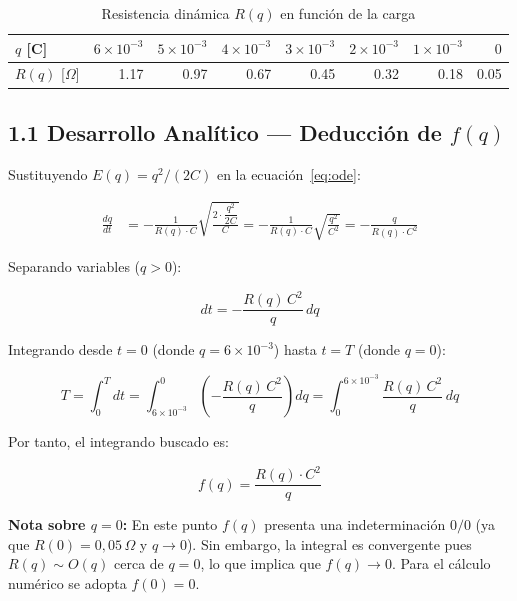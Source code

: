 \documentclass[12pt,a4paper]{article}
\begin{document}
\begin{table}[H]
    \centering
    \caption{Resistencia dinámica $R(q)$ en función de la carga}
    \label{tab:Rq}
    \begin{tabular}{lrrrrrrr}
        \toprule
        $q$ [C] & $6\!\times\!10^{-3}$ & $5\!\times\!10^{-3}$ & $4\!\times\!10^{-3}$ &
                  $3\!\times\!10^{-3}$ & $2\!\times\!10^{-3}$ & $1\!\times\!10^{-3}$ & $0$ \\
        \midrule
        $R(q)$ [$\Omega$] & 1.17 & 0.97 & 0.67 & 0.45 & 0.32 & 0.18 & 0.05 \\
        \bottomrule
    \end{tabular}
\end{table}

\subsection{1.1 Desarrollo Analítico --- Deducción de $f(q)$}

Sustituyendo $E(q) = q^2/(2C)$ en la ecuación~\eqref{eq:ode}:

\begin{align}
    \frac{dq}{dt}
    &= -\frac{1}{R(q)\cdot C}\sqrt{\frac{2\cdot\dfrac{q^2}{2C}}{C}}
     = -\frac{1}{R(q)\cdot C}\sqrt{\frac{q^2}{C^2}}
     = -\frac{q}{R(q)\cdot C^2}
    \label{eq:ode2}
\end{align}

Separando variables ($q > 0$):

\begin{equation}
    dt = -\frac{R(q)\,C^2}{q}\,dq
\end{equation}

Integrando desde $t=0$ (donde $q=6\times10^{-3}$) hasta $t=T$ (donde $q=0$):

\begin{equation}
    T = \int_0^T dt
      = \int_{6\times10^{-3}}^{0} \left(-\frac{R(q)\,C^2}{q}\right) dq
      = \int_0^{6\times10^{-3}} \frac{R(q)\,C^2}{q}\,dq
\end{equation}

Por tanto, el integrando buscado es:

\begin{equation}
    \boxed{f(q) = \frac{R(q)\cdot C^2}{q}}
    \label{eq:fq}
\end{equation}

\textbf{Nota sobre $q=0$:} En este punto $f(q)$ presenta una indeterminación
$0/0$ (ya que $R(0)=0{,}05\,\Omega$ y $q\to 0$). Sin embargo, la integral
es convergente pues $R(q)\sim O(q)$ cerca de $q=0$, lo que implica que $f(q)\to 0$.
Para el cálculo numérico se adopta $f(0)=0$.
\end{document}
